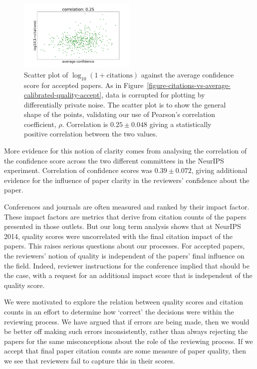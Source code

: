 \documentclass[twoside]{article}
\begin{document}
\begin{figure}[htb]
\centering
\includegraphics[width=0.5\textwidth]{diagrams/neurips/citations-vs-average-confidence-accept.pdf}

\caption{Scatter plot of $\log_{10}(1+\text{citations})$ against the
  average confidence score for accepted papers. As in Figure~\ref{figure-citations-vs-average-calibrated-quality-accept}, data is
  corrupted for plotting by differentially private noise. The scatter
  plot is to show the general shape of the points, validating our use
  of Pearson's correlation coefficient, $\rho$. Correlation is $0.25
  \pm 0.048$ giving a statistically positive correlation between the
  two values.}
\label{figure-citations-vs-average-confidence-accept}
\end{figure}

More evidence for this notion of clarity comes from analysing the
correlation of the confidence score across the two different
committees in the NeurIPS experiment. Correlation of confidence scores
was $0.39 \pm 0.072$, giving additional evidence for
the influence of paper clarity in the reviewers' confidence about the paper.

Conferences and journals are often measured and ranked by their impact
factor. These impact factors are metrics that derive from citation
counts of the papers presented in those outlets. But our long term
analysis shows that at NeurIPS 2014, quality scores were uncorrelated
with the final citation impact of the papers. This raises serious
questions about our processes. For accepted papers, the reviewers' notion of quality is independent of the papers' final
influence on the field. Indeed, reviewer instructions for the
conference implied that should be the case, with a request for an
additional impact score that is independent of the quality score.

We were motivated to explore the relation between quality scores and
citation counts in an effort to determine how `correct' the decisions
were within the reviewing process. We have argued that if errors are
being made, then we would be better off making such errors
inconsistently, rather than always rejecting the papers for the same
misconceptions about the role of the reviewing process. If we accept
that final paper citation counts are some measure of paper quality,
then we see that reviewers fail to capture this in their scores.
\end{document}
